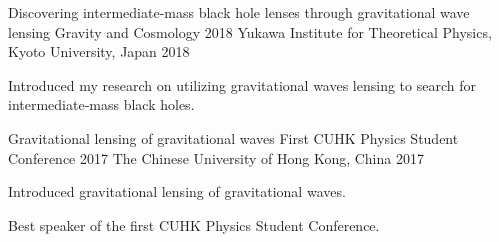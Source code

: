 \begin{cventries}
  \cventry
    {Discovering intermediate‑mass black hole lenses through gravitational wave lensing} %
    {Gravity and Cosmology 2018} %
    {Yukawa Institute for Theoretical Physics, Kyoto University, Japan} %
    {2018} %
    {
      \begin{cvitems} %
        \item {Introduced my research on utilizing gravitational waves lensing to search for intermediate‑mass black holes.}
      \end{cvitems}
    }

  \cventry
    {Gravitational lensing of gravitational waves} %
    {First CUHK Physics Student Conference 2017} %
    {The Chinese University of Hong Kong, China} %
    {2017} %
    {
      \begin{cvitems} %
        \item {Introduced gravitational lensing of gravitational waves.}
        \item {Best speaker of the first CUHK Physics Student Conference.}
      \end{cvitems}
    }

\end{cventries}
